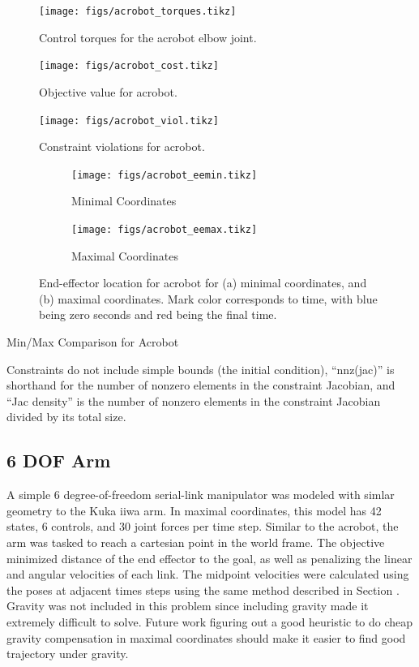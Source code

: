 \documentclass[conference]{IEEEtran}
\begin{document}
\begin{figure}
    \centering
    \texttt{[image: figs/acrobot\_torques.tikz]}
    \caption{Control torques for the acrobot elbow joint.}
    \label{fig:acrobot_torques}
\end{figure}
\begin{figure}
    \centering
    \texttt{[image: figs/acrobot\_cost.tikz]}
    \caption{Objective value for acrobot.}
    \label{fig:acrobot_cost}
\end{figure}
\begin{figure}
    \centering
    \texttt{[image: figs/acrobot\_viol.tikz]}
    \caption{Constraint violations for acrobot.}
    \label{fig:acrobot_viol}
\end{figure}
\begin{figure}
    \centering
    \begin{subfigure}{0.9\columnwidth}
        \texttt{[image: figs/acrobot\_eemin.tikz]}
        \caption{Minimal Coordinates}
        \label{fig:acrobot_eemin}
    \end{subfigure}
    \begin{subfigure}{0.9\columnwidth}
        \texttt{[image: figs/acrobot\_eemax.tikz]}
        \caption{Maximal Coordinates}
        \label{fig:acrobot_eemax}
    \end{subfigure}
    \label{fig:acrobot_endeffector}
    \caption{End-effector location for acrobot for (a) minimal 
        coordinates, and (b) maximal coordinates. Mark color 
        corresponds to time, with blue being zero seconds and red being the final time.
    }
\end{figure}

\begin{table}
    \centering 
    \caption{Min/Max Comparison for Acrobot}
    
    \caption*{ \small
        Constraints do not include simple bounds (the initial condition), ``nnz(jac)'' 
        is shorthand for the number of nonzero elements in the constraint Jacobian, and 
        ``Jac density'' is the number of nonzero elements in the constraint Jacobian 
        divided by its total size.
    }
    \label{tab:acrobot}
\end{table}


\subsection{6 DOF Arm}
A simple 6 degree-of-freedom serial-link manipulator was modeled with simlar geometry to the
Kuka iiwa arm. In maximal coordinates, this model has 42 states, 6 controls, and 30 joint 
forces per time step. Similar to the acrobot, the arm was tasked to reach a cartesian point
in the world frame. The objective minimized distance of the end effector to the goal, as 
well as penalizing the linear and angular velocities of each link. The midpoint velocities 
were calculated using the poses at adjacent times steps using the same method described in 
Section \label{sec:discrete_dynamics}. Gravity was not included in this problem since 
including gravity made it extremely difficult to solve. Future work figuring out a good 
heuristic to do cheap gravity compensation in maximal coordinates should make it easier to
find good trajectory under gravity. 
\end{document}
